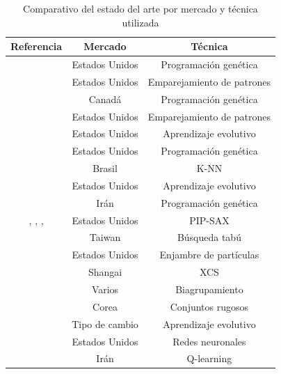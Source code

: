 \documentclass[12pt]{report}
\theoremstyle{break}
\theoremstyle{break}
\begin{document}
\begin{center}
\begin{table}[htbp]
\centering
\begin{tabular}{ccc}
\hline
\textbf{Referencia} & \textbf{Mercado} & \textbf{Técnica} \\
\hline
\cite{Allen1999} & Estados Unidos & Programación genética \\
\cite{Leigh2002} & Estados Unidos & Emparejamiento de patrones\\
\cite{Potvin2004} & Canadá & Programación genética\\
\cite{Parracho2010} & Estados Unidos & Emparejamiento de patrones\\
\cite{Kaucic2010} & Estados Unidos & Aprendizaje evolutivo\\
\cite{Lohpetch2010} & Estados Unidos & Programación genética\\
\cite{Teixeira2010} & Brasil & K-NN\\
\cite{Preen2010} & Estados Unidos & Aprendizaje evolutivo\\
\cite{Esfahanipour2011} & Irán & Programación genética\\
\cite{Canelas2012-gecco}, \cite{Canelas2013-gecco}, \cite{Canelas2013-journal}, \cite{Leitao2016} & Estados Unidos & PIP-SAX \\
\cite{Kuo2013} & Taiwan & Búsqueda tabú \\
\cite{Wang2014} & Estados Unidos & Enjambre de partículas \\
\cite{Hu2015-XCS} & Shangai & XCS \\
\cite{Huang2015} & Varios & Biagrupamiento \\
\cite{Kim2016} & Corea & Conjuntos rugosos \\
\cite{Kampouridis2017} & Tipo de cambio & Aprendizaje evolutivo\\
\cite{Sezer2017} & Estados Unidos & Redes neuronales\\
\cite{Alimoradi2018} & Irán & Q-learning\\
\hline
\end{tabular}
\caption{\label{tabla:referencia-mercado-tecnica} Comparativo del estado del arte por mercado y técnica utilizada}
\end{table}
\end{center}
\end{document}
